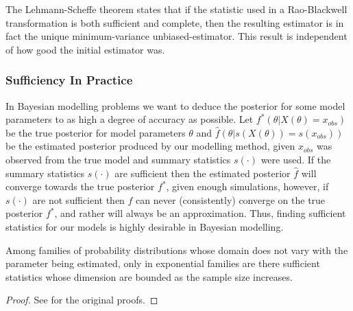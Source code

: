 \documentclass[bibliography=totoc,11pt,a4paper,margin=0]{article}
\theoremstyle{break}
\begin{document}
  \par The Lehmann-Scheffe theorem \cite[]{lehmann_scheffe_theorem} states that if the statistic used in a Rao-Blackwell transformation is both sufficient and complete, then the resulting estimator is in fact the unique minimum-variance unbiased-estimator. This result is independent of how good the initial estimator was. %


  \subsubsection*{Sufficiency In Practice}

  \par In Bayesian modelling problems we want to deduce the posterior for some model parameters to as high a degree of accuracy as possible. Let $f^*(\theta|X(\theta)=x_{obs})$ be the true posterior for model parameters $\theta$ and $\hat{f}(\theta|s(X(\theta))=s(x_{obs}))$ be the estimated posterior produced by our modelling method, given $x_{obs}$ was observed from the true model and summary statistics $s(\cdot)$ were used. If the summary statistics $s(\cdot)$ are sufficient then the estimated posterior $\hat{f}$ will converge towards the true posterior $f^*$, given enough simulations, however, if $s(\cdot)$ are not sufficient then $\hat{f}$ can never (consistently) converge on the true posterior $f^*$, and rather will always be an approximation. Thus, finding sufficient statistics for our models is highly desirable in Bayesian modelling. %

  \begin{box_theorem}\label{the_pitman_koopman_darmois}
    Among families of probability distributions whose domain does not vary with the parameter being estimated, only in exponential families are there sufficient statistics whose dimension are bounded as the sample size increases.
    \begin{proof}
      See \cite[]{pkd_theorem_darmois_part,pkd_theorem_pitman_part,pkd_theorem_koopman_part} for the original proofs.
    \end{proof}
  \end{box_theorem}
\end{document}
